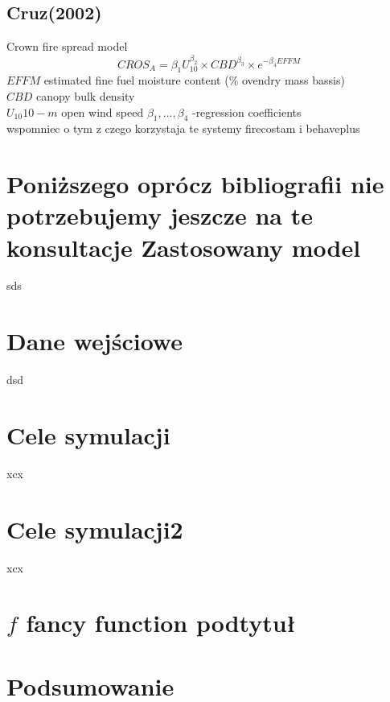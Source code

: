 \documentclass[a4paper, 11pt]{article}
\begin{document}
\subsection{Cruz(2002)}
\indent
Crown fire spread model
$$
CROS_A=\beta_1U^{\beta_2}_10 \times CBD^{\beta_3} \times e^{-\beta_4EFFM}
$$
$EFFM$ estimated fine fuel moisture content (\% ovendry mass bassis)\\
$CBD$ canopy bulk density\\
$U_10  10-m$ open wind speed
$\beta_1, ...,\beta_4$ -regression coefficients\\
	

	wspomniec o tym z czego korzystaja te systemy firecostam i behaveplus
	
	
	
	\section{Poniższego oprócz bibliografii nie potrzebujemy jeszcze na te konsultacje  Zastosowany model}
	\indent

		
sds
	\section*{Dane wejściowe}
	\indent
	
	dsd
	\section*{Cele symulacji}
	\indent
	
xcx
	\section*{Cele symulacji2}
	\indent
	
	xcx
	\section*{$ f $ fancy function podtytuł}
	\indent
	\begin{figure}[H]%
	\end{figure}
	\section*{Podsumowanie}
	\indent
	
\end{document}
